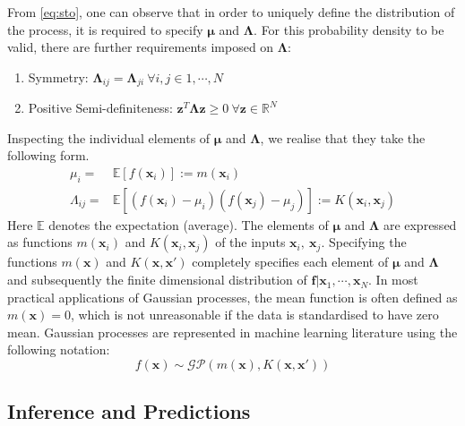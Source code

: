 From \cref{eq:sto}, one can observe that in order to uniquely define the distribution of the 
process, it is required to specify $\mathbf{\mu}$ and $\mathbf{\Lambda}$. For this probability 
density to be valid, there are further requirements imposed on $\mathbf{\Lambda}$: 


\begin{enumerate}
      \item Symmetry: 
            $\mathbf{\Lambda}_{ij} = \mathbf{\Lambda}_{ji} \ \forall i,j \in {1, \cdots, N} $ 
      \item Positive Semi-definiteness: 
            $\mathbf{z}^T \mathbf{\Lambda} \mathbf{z} \geq 0 \ \forall \mathbf{z} \in \mathbb{R}^N$  
\end{enumerate}

Inspecting the individual elements of $\mathbf{\mu}$ and $\mathbf{\Lambda}$, we realise that they 
take the following form.
%
\begin{align}
      \mu_i = & \mathbb{E}[f(\mathbf{x}_i)] := m(\mathbf{x}_i) \\
      \Lambda_{ij} = & \mathbb{E}[(f(\mathbf{x}_i) - \mu_i)(f(\mathbf{x}_j) - \mu_j)] := K(\mathbf{x}_i, \mathbf{x}_j)
\end{align}
%
Here $\mathbb{E}$ denotes the expectation (average). The elements of $\mathbf{\mu}$ and 
$\mathbf{\Lambda}$ are expressed as functions $m(\mathbf{x}_i)$ and $K(\mathbf{x}_i, \mathbf{x}_j)$ 
of the inputs $\mathbf{x}_i,\ \mathbf{x}_j$. Specifying the functions $m(\mathbf{x})$ and 
$K(\mathbf{x}, \mathbf{x}')$ completely specifies each element of 
$\mathbf{\mu}$ and $\mathbf{\Lambda}$ and subsequently the finite dimensional distribution of 
$\mathbf{f} | \mathbf{x}_1, \cdots, \mathbf{x}_N $. In most practical applications of 
Gaussian processes, the mean function is often defined as $m(\mathbf{x}) = 0$, which is not 
unreasonable if the data is standardised to have zero mean. Gaussian processes are 
represented in machine learning literature using the following notation:
%
\begin{equation}\label{eq:gpformulation}
    f(\mathbf{x}) \sim \mathcal{GP}(m(\mathbf{x}), K(\mathbf{x}, \mathbf{x}'))
\end{equation}

\subsection{Inference and Predictions} \label{sec:inference}

